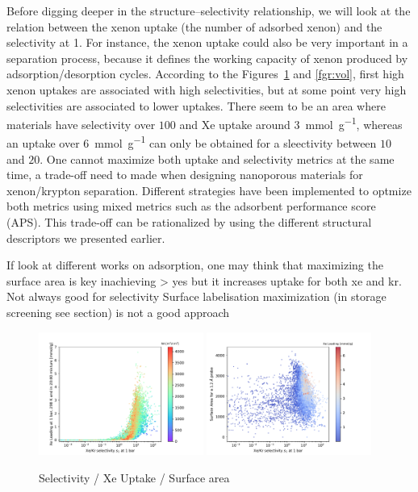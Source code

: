 \documentclass[main.tex]{subfiles}
\begin{document}
Before digging deeper in the structure--selectivity relationship, we will look at the relation between the xenon uptake (the number of adsorbed xenon) and the selectivity at \SI{1}{\atm}. For instance, the xenon uptake could also be very important in a separation process, because it defines the working capacity of xenon produced by adsorption/desorption cycles. According to the Figures~\ref{fgr:sa} and \ref{fgr:vol}, first high xenon uptakes are associated with high selectivities, but at some point very high selectivities are associated to lower uptakes. There seem to be an area where materials have selectivity over $100$ and Xe uptake around \SI{3}{\milli\mole\per\gram}, whereas an uptake over \SI{6}{\milli\mole\per\gram} can only be obtained for a sleectivity between $10$ and $20$. One cannot maximize both uptake and selectivity metrics at the same time, a trade-off need to made when designing nanoporous materials for xenon/krypton separation.\cite{Zhang_2022} Different strategies have been implemented to optmize both metrics using mixed metrics such as the adsorbent performance score (APS).\cite{Solanki_2020}
This trade-off can be rationalized by using the different structural descriptors we presented earlier. 


If look at different works on adsorption, one may think that maximizing the surface area is key inachieving > yes but it increases uptake for both xe and kr. Not always good for selectivity
Surface labelisation maximization (in storage screening see section) is not a good approach

\begin{figure}[ht]
  \centering
  \includegraphics[width=0.48\textwidth]{figures/2-thermo/Scatterplot_uptake_selectivity_sa.pdf}
  \includegraphics[width=0.48\textwidth]{figures/2-thermo/Scatterplot_sa_selectivity.pdf}
  \caption{Selectivity / Xe Uptake / Surface area}\label{fgr:sa}
\end{figure}
\end{document}
